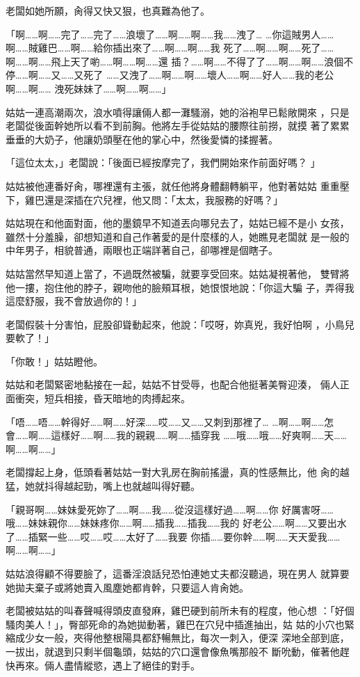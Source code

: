 老闆如她所願，肏得又快又狠，也真難為他了。

「啊……啊……完了……完了……浪壞了……啊……啊……我……洩了…
…你這賊男人……啊……賊雞巴……啊……給你插出來了……啊……啊……我
死了……啊……啊……死了……啊……啊……飛上天了喲……啊……啊……還
插？……啊……不得了了……啊……啊……浪個不停……啊……又……又死了
……又洩了……啊……啊……壞人……啊……好人……我的老公啊……啊……
洩死妹妹了……啊……啊……」

姑姑一連高潮兩次，浪水噴得讓倆人都一灘騷溺，她的浴袍早已鬆敞開來
，只是老闆從後面幹她所以看不到前胸。他將左手從姑姑的腰際往前撈，就摸
著了累累垂垂的大奶子，他讓奶頭壓在他的掌心中，然後愛憐的揉握著。

「這位太太，」老闆說：「後面已經按摩完了，我們開始來作前面好嗎？
」

姑姑被他連番好肏，哪裡還有主張，就任他將身體翻轉躺平，他對著姑姑
重重壓下，雞巴還是深插在穴兒裡，他又問：「太太，我服務的好嗎？」

姑姑現在和他面對面，他的墨鏡早不知道丟向哪兒去了，姑姑已經不是小
女孩，雖然十分羞臊，卻想知道和自己作著愛的是什麼樣的人，她瞧見老闆就
是一般的中年男子，相貌普通，兩眼也正端詳著自己，卻哪裡是個瞎子。

姑姑當然早知道上當了，不過既然被騙，就要享受回來。姑姑凝視著他，
雙臂將他一摟，抱住他的脖子，親吻他的臉頰耳根，她恨恨地說：「你這大騙
子，弄得我這麼舒服，我不會放過你的！」

老闆假裝十分害怕，屁股卻聳動起來，他說：「哎呀，妳真兇，我好怕啊
，小鳥兒要軟了！」

「你敢！」姑姑瞪他。

姑姑和老闆緊密地黏接在一起，姑姑不甘受辱，也配合他挺著美臀迎湊，
倆人正面衝突，短兵相接，昏天暗地的肉搏起來。

「唔……唔……幹得好……啊……好深……哎……又……又刺到那裡了…
…啊……啊……怎會……啊……這樣好……啊……我的親親……啊……插穿我
……哦……哦……好爽啊……天……啊……啊……」

老闆撐起上身，低頭看著姑姑一對大乳房在胸前搖盪，真的性感無比，他
肏的越猛，她就抖得越起勁，嘴上也就越叫得好聽。

「親哥啊……妹妹愛死妳了……啊……我……從沒這樣好過……啊……你
好厲害呀……哦……妹妹親你……妹妹疼你……啊……插我……插我……我的
好老公……啊……又要出水了……插緊一些……哎……哎……太好了……我要
你插……要你幹……啊……天天愛我……啊……啊……」

姑姑浪得顧不得要臉了，這番淫浪話兒恐怕連她丈夫都沒聽過，現在男人
就算要她拋夫棄子或將她賣入風塵她都肯幹，只要這人肯肏她。

老闆被姑姑的叫春聲喊得頭皮直發麻，雞巴硬到前所未有的程度，他心想
：「好個騷肉美人！」，臀部死命的為她拋動著，雞巴在穴兒中插進抽出，姑
姑的小穴也緊縮成少女一般，夾得他整根陽具都舒暢無比，每次一刺入，便深
深地全部到底，一拔出，就退到只剩半個龜頭，姑姑的穴口還會像魚嘴那般不
斷吮動，催著他趕快再來。倆人盡情縱慾，遇上了絕佳的對手。

